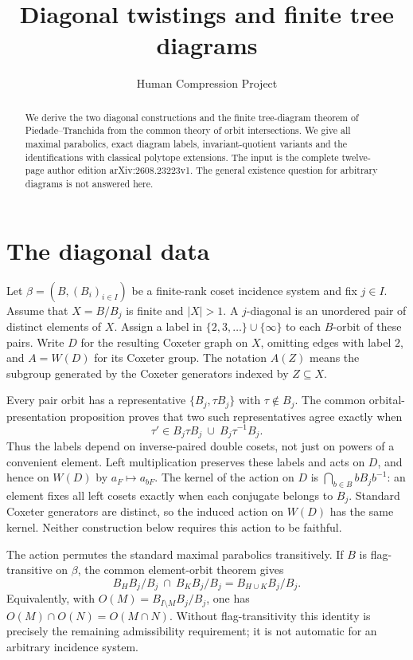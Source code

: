 
\title{Diagonal twistings and finite tree diagrams}
\author{Human Compression Project}\date{}
\maketitle
\begin{abstract}
We derive the two diagonal constructions and the finite tree-diagram theorem of Piedade--Tranchida from the common theory of orbit intersections. We give all maximal parabolics, exact diagram labels, invariant-quotient variants and the identifications with classical polytope extensions. The input is the complete twelve-page author edition arXiv:2608.23223v1. The general existence question for arbitrary diagrams is not answered here.
\end{abstract}
\section{The diagonal data}
Let $\beta=(B,(B_i)_{i\in I})$ be a finite-rank coset incidence system and fix $j\in I$. Assume that $X=B/B_j$ is finite and $|X|>1$. A $j$-diagonal is an unordered pair of distinct elements of $X$. Assign a label in $\{2,3,\ldots\}\cup\{\infty\}$ to each $B$-orbit of these pairs. Write $D$ for the resulting Coxeter graph on $X$, omitting edges with label $2$, and $A=W(D)$ for its Coxeter group. The notation $A(Z)$ means the subgroup generated by the Coxeter generators indexed by $Z\subseteq X$.

Every pair orbit has a representative $\{B_j,\tau B_j\}$ with $\tau\notin B_j$. The common orbital-presentation proposition proves that two such representatives agree exactly when
\[
\tau'\in B_j\tau B_j\ \cup\ B_j\tau^{-1}B_j.
\]
Thus the labels depend on inverse-paired double cosets, not just on powers of a convenient element. Left multiplication preserves these labels and acts on $D$, and hence on $W(D)$ by $a_F\mapsto a_{bF}$. The kernel of the action on $D$ is $\bigcap_{b\in B}bB_jb^{-1}$: an element fixes all left cosets exactly when each conjugate belongs to $B_j$. Standard Coxeter generators are distinct, so the induced action on $W(D)$ has the same kernel. Neither construction below requires this action to be faithful.

The action permutes the standard maximal parabolics transitively. If $B$ is flag-transitive on $\beta$, the common element-orbit theorem gives
\begin{equation}\label{eq:admissibility}
B_HB_j/B_j\ \cap\ B_KB_j/B_j=B_{H\cup K}B_j/B_j.
\end{equation}
Equivalently, with $O(M)=B_{I\setminus M}B_j/B_j$, one has $O(M)\cap O(N)=O(M\cap N)$. Without flag-transitivity this identity is precisely the remaining admissibility requirement; it is not automatic for an arbitrary incidence system.

